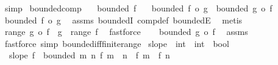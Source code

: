 \begin{isabellebody}
\ simp%
\endisatagproof
{\isafoldproof}%
%
\isadelimproof
\isanewline
%
\endisadelimproof
\isanewline
{}\isamarkupfalse%
\ bounded{\isacharunderscore}{\kern0pt}comp{\isacharcolon}{\kern0pt}\isanewline
\ \ \ {\isachardoublequoteopen}bounded\ f{\isachardoublequoteclose}\isanewline
\ \ \ {\isachardoublequoteopen}bounded\ {\isacharparenleft}{\kern0pt}f\ o\ g{\isacharparenright}{\kern0pt}{\isachardoublequoteclose}\ \ {\isachardoublequoteopen}bounded\ {\isacharparenleft}{\kern0pt}g\ o\ f{\isacharparenright}{\kern0pt}{\isachardoublequoteclose}\isanewline
%
\isadelimproof
%
\endisadelimproof
%
\isatagproof
{}\isamarkupfalse%
\ {\isacharminus}{\kern0pt}\isanewline
\ \ \isamarkupfalse%
\ {\isachardoublequoteopen}bounded\ {\isacharparenleft}{\kern0pt}f\ o\ g{\isacharparenright}{\kern0pt}{\isachardoublequoteclose}\ \isamarkupfalse%
\ assms\ boundedI\ comp{\isacharunderscore}{\kern0pt}def\ boundedE\ \isamarkupfalse%
\ metis\isanewline
{}\isamarkupfalse%
\isanewline
\ \ \isamarkupfalse%
\ {\isachardoublequoteopen}range\ {\isacharparenleft}{\kern0pt}g\ o\ f{\isacharparenright}{\kern0pt}\ {\isacharequal}{\kern0pt}\ g\ {\isacharbackquote}{\kern0pt}\ range\ f{\isachardoublequoteclose}\ \isamarkupfalse%
\ fastforce\isanewline
\ \ \isamarkupfalse%
\ {\isachardoublequoteopen}bounded\ {\isacharparenleft}{\kern0pt}g\ o\ f{\isacharparenright}{\kern0pt}{\isachardoublequoteclose}\ \isamarkupfalse%
\ assms\ \isamarkupfalse%
\ {\isacharparenleft}{\kern0pt}fastforce\ simp{\isacharcolon}{\kern0pt}\ bounded{\isacharunderscore}{\kern0pt}iff{\isacharunderscore}{\kern0pt}finite{\isacharunderscore}{\kern0pt}range{\isacharparenright}{\kern0pt}\isanewline
{}\isamarkupfalse%
%
\endisatagproof
{\isafoldproof}%
%
\isadelimproof
%
\endisadelimproof
%
\isadelimdocument
%
\endisadelimdocument
%
\isatagdocument
%
\isamarkuptrue%
%
\endisatagdocument
{\isafolddocument}%
%
\isadelimdocument
%
\endisadelimdocument
{}\isamarkupfalse%
\ slope\ {\isacharcolon}{\kern0pt}{\isacharcolon}{\kern0pt}\ {\isachardoublequoteopen}{\isacharparenleft}{\kern0pt}int\ {\isasymRightarrow}\ int{\isacharparenright}{\kern0pt}\ {\isasymRightarrow}\ bool{\isachardoublequoteclose}\ \isanewline
\ \ {\isachardoublequoteopen}slope\ f\ {\isasymlongleftrightarrow}\ bounded\ {\isacharparenleft}{\kern0pt}{\isasymlambda}{\isacharparenleft}{\kern0pt}m{\isacharcomma}{\kern0pt}\ n{\isacharparenright}{\kern0pt}{\isachardot}{\kern0pt}\ f\ {\isacharparenleft}{\kern0pt}m\ {\isacharplus}{\kern0pt}\ n{\isacharparenright}{\kern0pt}\ {\isacharminus}{\kern0pt}\ {\isacharparenleft}{\kern0pt}f\ m\ {\isacharplus}{\kern0pt}\ f\ n{\isacharparenright}{\kern0pt}{\isacharparenright}{\kern0pt}{\isachardoublequoteclose}\isanewline

\end{isabellebody}
